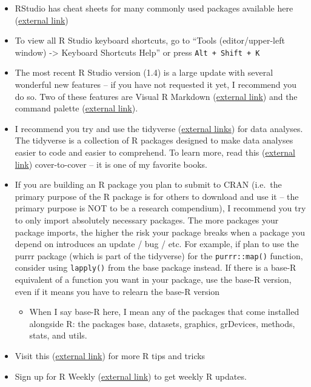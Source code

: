 \documentclass[
]{book}
\providecommand{\tightlist}{%
  \setlength{\itemsep}{0pt}\setlength{\parskip}{0pt}}
\begin{document}
\begin{itemize}
\tightlist
\item
  RStudio has cheat sheets for many commonly used packages available here (\href{https://www.rstudio.com/resources/cheatsheets/}{external link})
\item
  To view all R Studio keyboard shortcuts, go to ``Tools (editor/upper-left window) -\textgreater{} Keyboard Shortcuts Help'' or press \texttt{Alt\ +\ Shift\ +\ K}
\item
  The most recent R Studio version (1.4) is a large update with several wonderful new features -- if you have not requested it yet, I recommend you do so. Two of these features are Visual R Markdown (\href{https://blog.rstudio.com/2020/09/30/rstudio-v1-4-preview-visual-markdown-editing/}{external link}) and the command palette (\href{https://blog.rstudio.com/2020/10/14/rstudio-v1-4-preview-command-palette/}{external link}).
\item
  I recommend you try and use the tidyverse (\href{https://www.tidyverse.org/}{external links}) for data analyses. The tidyverse is a collection of R packages designed to make data analyses easier to code and easier to comprehend. To learn more, read this (\href{https://r4ds.had.co.nz/}{external link}) cover-to-cover -- it is one of my favorite books.
\item
  If you are building an R package you plan to submit to CRAN (i.e.~the primary purpose of the R package is for others to download and use it -- the primary purpose is NOT to be a research compendium), I recommend you try to only import absolutely necessary packages. The more packages your package imports, the higher the risk your package breaks when a package you depend on introduces an update / bug / etc. For example, if plan to use the purrr package (which is part of the tidyverse) for the \texttt{purrr::map()} function, consider using \texttt{lapply()} from the base package instead. If there is a base-R equivalent of a function you want in your package, use the base-R version, even if it means you have to relearn the base-R version

  \begin{itemize}
  \tightlist
  \item
    When I say base-R here, I mean any of the packages that come installed alongside R: the packages base, datasets, graphics, grDevices, methods, stats, and utils.
  \end{itemize}
\item
  Visit this (\href{https://twitter.com/rstudiotips?lang=en}{external link}) for more R tips and tricks
\item
  Sign up for R Weekly (\href{https://rweekly.org/}{external link}) to get weekly R updates.
\end{itemize}
\end{document}
